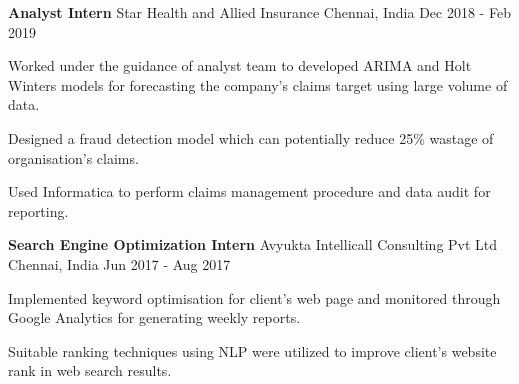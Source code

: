 \begin{cventries}
  \cventry
    {\textbf{Analyst Intern}} %
    {Star Health and Allied Insurance} %
    {Chennai, India} %
    {Dec 2018 - Feb 2019} %
    {
      \begin{cvitems} %
        \normalsize{\item {Worked under the guidance of analyst team to developed ARIMA and Holt Winters models for forecasting the company’s claims target using large volume of data.}
        \item {Designed a fraud detection model which can potentially reduce 25\% wastage of organisation's claims.}
        \item {Used Informatica to perform claims management procedure and data audit for reporting.}}
      \end{cvitems}
    }

  \cventry
    {\textbf{Search Engine Optimization Intern}} 
    {Avyukta Intellicall Consulting Pvt Ltd}
    {Chennai, India}
    {Jun 2017 - Aug 2017}
    {
      \begin{cvitems} %
        \normalsize{\item {Implemented keyword optimisation for client's web page and monitored through Google Analytics for generating weekly reports.}
        \item {Suitable ranking techniques using NLP were utilized to improve client's website rank in web search results.}}
      \end{cvitems}
    }


\end{cventries}
